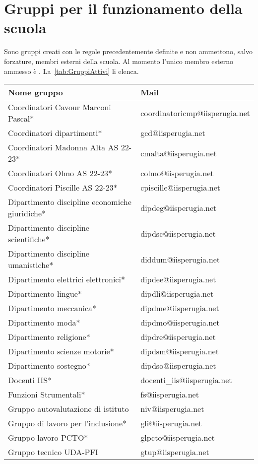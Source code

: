 \section{Gruppi per il funzionamento della scuola }
Sono gruppi creati con le regole precedentemente definite e non ammettono, salvo forzature, membri esterni della scuola. Al momento l'unico membro esterno ammesso è . La~\cref{tab:GruppiAttivi} li elenca.
\begin{table}
	\centering
	\begin{tabular}{ll}
		\toprule
Nome gruppo&Mail\\
\midrule
Coordinatori Cavour Marconi Pascal*&
coordinatoricmp@iisperugia.net  \\
Coordinatori dipartimenti*&
gcd@iisperugia.net\\
Coordinatori Madonna Alta AS 22-23*&
cmalta@iisperugia.net\\
Coordinatori Olmo AS 22-23*&
colmo@iisperugia.net\\
Coordinatori Piscille AS 22-23*&
cpiscille@iisperugia.net\\
Dipartimento discipline economiche giuridiche*&
dipdeg@iisperugia.net\\
Dipartimento discipline scientifiche*&
dipdsc@iisperugia.net\\
Dipartimento discipline umanistiche*&
diddum@iisperugia.net\\
Dipartimento elettrici elettronici*&
dipdee@iisperugia.net\\
Dipartimento lingue*&
dipdli@iisperugia.net\\
Dipartimento meccanica*&
dipdme@iisperugia.net\\
Dipartimento moda*&
dipdmo@iisperugia.net\\
Dipartimento religione*&
dipdre@iisperugia.net\\
Dipartimento scienze motorie*&
dipdsm@iisperugia.net\\
Dipartimento sostegno*&
dipdso@iisperugia.net\\
Docenti IIS*&
docenti\_iis@iisperugia.net\\
Funzioni Strumentali*&
fs@iisperugia.net\\
Gruppo autovalutazione di istituto&
niv@iisperugia.net\\
Gruppo di lavoro per l'inclusione*&
gli@iisperugia.net\\
Gruppo lavoro PCTO*&
glpcto@iisperugia.net\\
Gruppo tecnico UDA-PFI&
gtup@iisperugia.net\\

\end{tabular}
\end{table}
